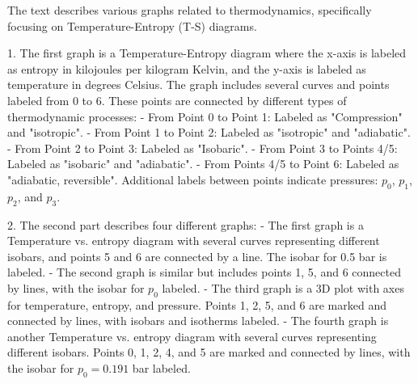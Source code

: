 The text describes various graphs related to thermodynamics, specifically focusing on Temperature-Entropy (T-S) diagrams.

1. The first graph is a Temperature-Entropy diagram where the x-axis is labeled as entropy in kilojoules per kilogram Kelvin, and the y-axis is labeled as temperature in degrees Celsius. The graph includes several curves and points labeled from 0 to 6. These points are connected by different types of thermodynamic processes:
   - From Point 0 to Point 1: Labeled as "Compression" and "isotropic".
   - From Point 1 to Point 2: Labeled as "isotropic" and "adiabatic".
   - From Point 2 to Point 3: Labeled as "Isobaric".
   - From Point 3 to Points 4/5: Labeled as "isobaric" and "adiabatic".
   - From Points 4/5 to Point 6: Labeled as "adiabatic, reversible".
   Additional labels between points indicate pressures: $p_0$, $p_1$, $p_2$, and $p_3$.

2. The second part describes four different graphs:
   - The first graph is a Temperature vs. entropy diagram with several curves representing different isobars, and points 5 and 6 are connected by a line. The isobar for 0.5 bar is labeled.
   - The second graph is similar but includes points 1, 5, and 6 connected by lines, with the isobar for $p_0$ labeled.
   - The third graph is a 3D plot with axes for temperature, entropy, and pressure. Points 1, 2, 5, and 6 are marked and connected by lines, with isobars and isotherms labeled.
   - The fourth graph is another Temperature vs. entropy diagram with several curves representing different isobars. Points 0, 1, 2, 4, and 5 are marked and connected by lines, with the isobar for $p_0 = 0.191$ bar labeled.